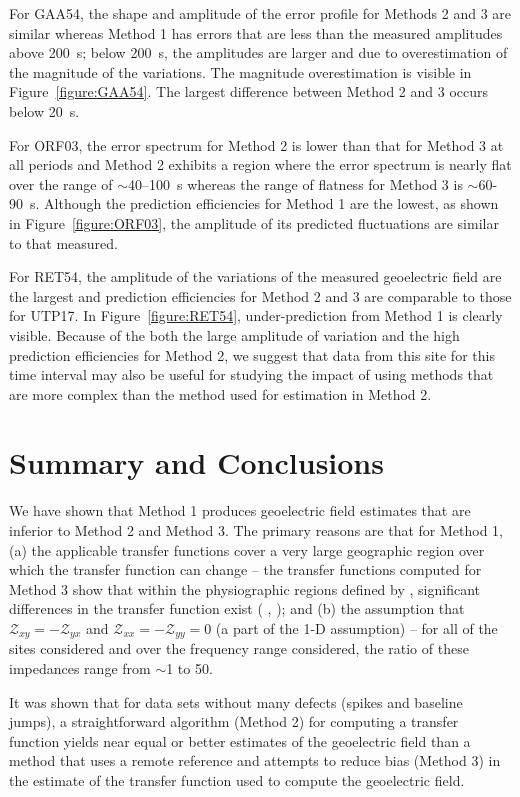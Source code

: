 \documentclass[12pt]{article}
\newcommand{\citeay}[1]{%
\citeauthor{#1}, \citeyear{#1}%
}
\begin{document}
For GAA54, the shape and amplitude of the error profile for Methods 2 and 3 are similar whereas Method 1 has errors that are less than the measured amplitudes above 200~s; below 200~s, the amplitudes are larger and due to overestimation of the magnitude of the variations.  The magnitude overestimation is visible in Figure~\ref{figure:GAA54}.  The largest difference between Method 2 and 3 occurs below 20~s.

For ORF03, the error spectrum for Method 2 is lower than that for Method 3 at all periods and Method 2 exhibits a region where the error spectrum is nearly flat over the range of $\sim$40--100~s whereas the range of flatness for Method 3 is $\sim$60-90~s.  Although the prediction efficiencies for Method 1 are the lowest, as shown in Figure~\ref{figure:ORF03}, the amplitude of its predicted fluctuations are similar to that measured.

For RET54, the amplitude of the variations of the measured geoelectric field are the largest and prediction efficiencies for Method 2 and 3 are comparable to those for UTP17.  In Figure~\ref{figure:RET54}, under-prediction from Method 1 is clearly visible.  Because of the both the large amplitude of variation and the high prediction efficiencies for Method 2, we suggest that data from this site for this time interval may also be useful for studying the impact of using methods that are more complex than the method used for estimation in Method 2.

\section{Summary and Conclusions}

We have shown that Method 1 produces geoelectric field estimates that are inferior to Method 2 and Method 3.  The primary reasons are that for Method 1, (a) the applicable transfer functions cover a very large geographic region over which the transfer function can change -- the transfer functions computed for Method 3 show that within the physiographic regions defined by \cite{Fernberg2012}, significant differences in the transfer function exist (\citeay{Bedrosian2015}); and (b) the assumption that $\mathcal{Z}_{xy}=-\mathcal{Z}_{yx}$ and $\mathcal{Z}_{xx}=-\mathcal{Z}_{yy} = 0$ (a part of the 1-D assumption) -- for all of the sites considered and over the frequency range considered, the ratio of these impedances range from $\sim$1 to 50.

It was shown that for data sets without many defects (spikes and baseline jumps), a straightforward algorithm (Method 2) for computing a transfer function yields near equal or better estimates of the geoelectric field than a method that uses a remote reference and attempts to reduce bias (Method 3) in the estimate of the transfer function used to compute the geoelectric field.
\end{document}
